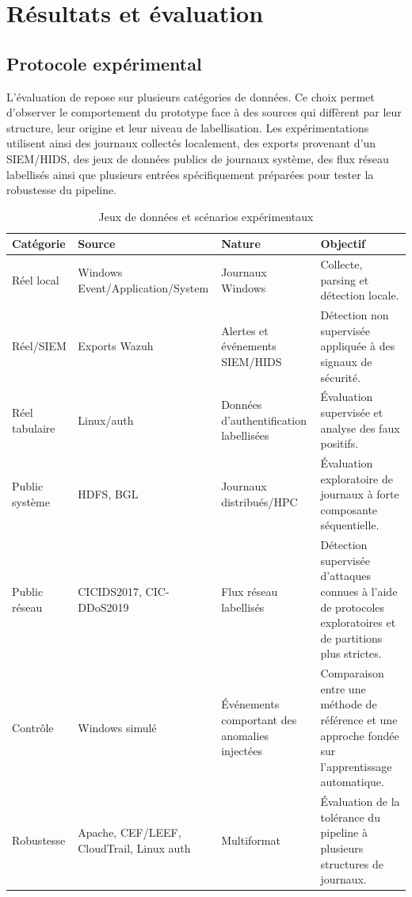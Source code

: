 \chapter{Résultats et évaluation}
\label{chap:resultats}

\section{Protocole expérimental}

L'évaluation de \logminer{} repose sur plusieurs catégories de données. Ce choix permet d'observer le comportement du prototype face à des sources qui diffèrent par leur structure, leur origine et leur niveau de labellisation. Les expérimentations utilisent ainsi des journaux collectés localement, des exports provenant d'un SIEM/HIDS, des jeux de données publics de journaux système, des flux réseau labellisés ainsi que plusieurs entrées spécifiquement préparées pour tester la robustesse du pipeline.

\begin{table}[H]
\centering
\caption{Jeux de données et scénarios expérimentaux}
\label{tab:datasets}
\scriptsize

\begin{tabularx}{\textwidth}{p{2.4cm}p{3.2cm}p{3cm}X}
\toprule
\textbf{Catégorie} &
\textbf{Source} &
\textbf{Nature} &
\textbf{Objectif}
\tabularnewline
\midrule

Réel local &
Windows Event/Application/System &
Journaux Windows &
Collecte, parsing et détection locale.
\tabularnewline

Réel/SIEM &
Exports Wazuh &
Alertes et événements SIEM/HIDS &
Détection non supervisée appliquée à des signaux de sécurité.
\tabularnewline

Réel tabulaire &
Linux/auth &
Données d'authentification labellisées &
Évaluation supervisée et analyse des faux positifs.
\tabularnewline

Public système &
HDFS, BGL &
Journaux distribués/HPC &
Évaluation exploratoire de journaux à forte composante séquentielle.
\tabularnewline

Public réseau &
CICIDS2017, CIC-DDoS2019 &
Flux réseau labellisés &
Détection supervisée d'attaques connues à l'aide de protocoles exploratoires et de partitions plus strictes.
\tabularnewline

Contrôle &
Windows simulé &
Événements comportant des anomalies injectées &
Comparaison entre une méthode de référence et une approche fondée sur l'apprentissage automatique.
\tabularnewline

Robustesse &
Apache, CEF/LEEF, CloudTrail, Linux auth &
Multiformat &
Évaluation de la tolérance du pipeline à plusieurs structures de journaux.
\tabularnewline

\bottomrule
\end{tabularx}
\end{table}

